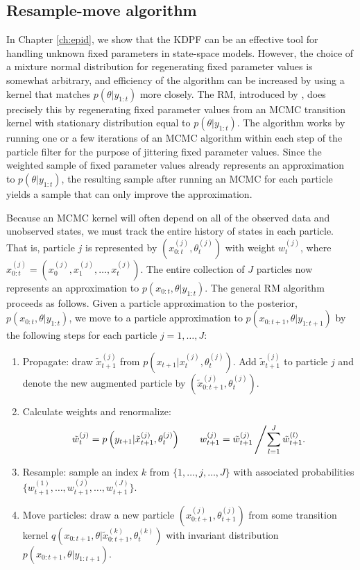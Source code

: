 \subsection{Resample-move algorithm} \label{sec:rm}

In Chapter \ref{ch:epid}, we show that the KDPF can be an effective tool for handling unknown fixed parameters in state-space models. However, the choice of a mixture normal distribution for regenerating fixed parameter values is somewhat arbitrary, and efficiency of the algorithm can be increased by using a kernel that matches $p(\theta|y_{1:t})$ more closely. The RM, introduced by \citet{Gilk:Berz:foll:2001}, does precisely this by regenerating fixed parameter values from an MCMC transition kernel with stationary distribution equal to $p(\theta|y_{1:t})$. The algorithm works by running one or a few iterations of an MCMC algorithm within each step of the particle filter for the purpose of jittering fixed parameter values. Since the weighted sample of fixed parameter values already represents an approximation to $p(\theta|y_{1:t})$, the resulting sample after running an MCMC for each particle yields a sample that can only improve the approximation.

Because an MCMC kernel will often depend on all of the observed data and unobserved states, we must track the entire history of states in each particle. That is, particle $j$ is represented by $\left(x_{0:t}^{(j)},\theta_t^{(j)}\right)$ with weight $w_t^{(j)}$, where $x_{0:t}^{(j)} = (x_0^{(j)},x_1^{(j)},\ldots,x_t^{(j)})$. The entire collection of $J$ particles now represents an approximation to $p(x_{0:t},\theta|y_{1:t})$. The general RM algorithm proceeds as follows. Given a particle approximation to the posterior, $p(x_{0:t},\theta|y_{1:t})$, we move to a particle approximation to $p(x_{0:t+1},\theta|y_{1:t+1})$ by the following steps for each particle $j=1,\ldots,J$:
\begin{enumerate}
\item Propagate: draw $\tilde{x}^{(j)}_{t+1}$ from $p\left(x_{t+1}|x^{(j)}_t,\theta^{(j)}_t\right)$. Add $\tilde{x}^{(j)}_{t+1}$ to particle $j$ and denote the new augmented particle by $\left(\tilde{x}^{(j)}_{0:t+1},\theta^{(j)}_t\right)$.
\item Calculate weights and renormalize:
    \[\tilde{w}^{(j)}_t = p\left(y_{t+1}|\tilde{x}^{(j)}_{t+1},\theta^{(j)}_t\right) \qquad w^{(j)}_{t+1} = \tilde{w}_{t+1}^{(j)}\left/\sum_{l=1}^J \tilde{w}_{t+1}^{(l)}. \right.\]
\item Resample: sample an index $k$ from $\{1,\ldots,j,\ldots,J\}$ with associated probabilities $\{w^{(1)}_{t+1},\ldots,w^{(j)}_{t+1},\ldots,w^{(J)}_{t+1}\}$.
\item \label{step:move} Move particles: draw a new particle $\left(x^{(j)}_{0:t+1},\theta^{(j)}_{t+1}\right)$ from some transition kernel $q\left(x_{0:t+1},\theta|\tilde{x}^{(k)}_{0:t+1},\theta^{(k)}_t\right)$ with invariant distribution $p(x_{0:t+1},\theta|y_{1:t+1})$.
\end{enumerate}

